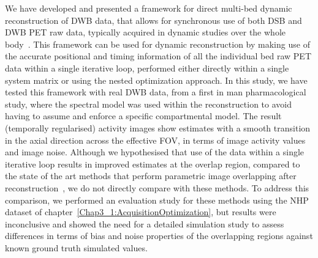 We have developed and presented a framework for direct multi-bed dynamic reconstruction of DWB data, that allows for synchronous use of both DSB and DWB PET raw data, typically acquired in dynamic studies over the whole body~\cite{Karakatsanis2013}. 
This framework can be used for dynamic reconstruction by making use of the accurate positional and timing information of all the individual bed raw PET data within a single iterative loop, performed either directly within a single system matrix or using the nested optimization approach.
In this study, we have tested this framework with real DWB data, from a first in man pharmacological study, where the spectral model was used within the reconstruction to avoid having to assume and enforce a specific compartmental model.
The result (temporally regularised) activity images show estimates with a smooth transition in the axial direction across the effective FOV, in terms of image activity values and image noise. Although we hypothesised that use of the data within a single iterative loop results in improved estimates at the overlap region, compared to the state of the art methods that perform parametric image overlapping after reconstruction~\cite{Karakatsanis2016a,Hu2020}, we do not directly compare with these methods. To address this comparison, we performed an evaluation study for these methods using the NHP dataset of chapter~\ref{Chap3_1:AcquisitionOptimization}, but results were inconclusive and showed the need for a detailed simulation study to assess differences in terms of bias and noise properties of the overlapping regions against known ground truth simulated values. 

